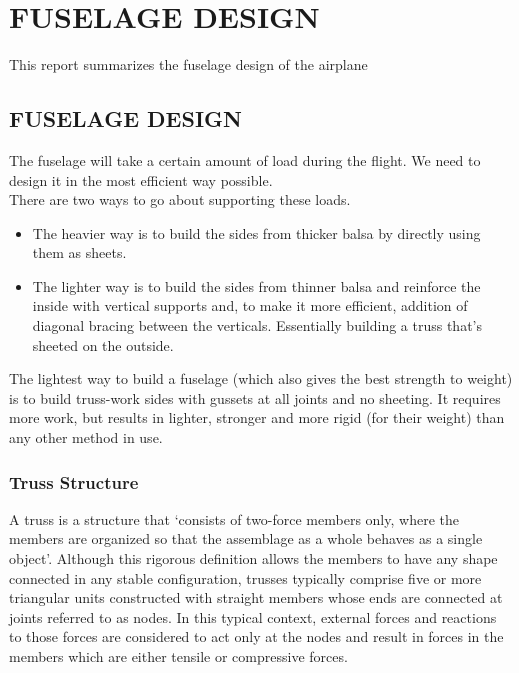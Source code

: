 \chapter{FUSELAGE DESIGN}
\label{ch3}
This report summarizes the fuselage design of the airplane

\section{FUSELAGE DESIGN}
\label{s:ch3_fuselagedesign}
The fuselage will take a certain amount of load during the flight. We need to design it in the most 
efficient way possible.
\\
There are two ways to go about supporting these loads. 
\begin{itemize}
\item The heavier way is to build the sides from thicker balsa by directly using them as sheets.
\item The lighter way is to build the sides from thinner balsa and reinforce the inside with vertical supports and, to make it more efficient, addition of diagonal bracing between the verticals. Essentially building a truss that's sheeted on the outside.
\end{itemize}
The lightest way to build a fuselage (which also gives the best strength to weight) is to build truss-work sides with gussets at all joints and no sheeting. It requires more work, but results in lighter, stronger and more rigid (for their weight) than any other method in use.

\subsection{Truss Structure}
A truss is a structure that `consists of two-force members only, where the members are organized so that the assemblage as a whole behaves as a single object'. Although this rigorous definition allows the members to have any shape connected in any stable configuration, trusses typically comprise five or more triangular units constructed with straight members whose ends are connected at joints referred to as nodes. In this typical context, external forces and reactions to those forces are considered to act only at the nodes and result in forces in the members which are either tensile or compressive forces.

